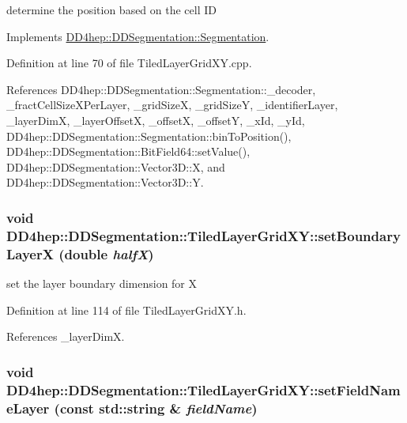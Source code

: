 determine the position based on the cell ID 

Implements \hyperlink{class_d_d4hep_1_1_d_d_segmentation_1_1_segmentation_a594fe6d78667415855858d083b64acad}{DD4hep::DDSegmentation::Segmentation}.

Definition at line 70 of file TiledLayerGridXY.cpp.

References DD4hep::DDSegmentation::Segmentation::\_\-decoder, \_\-fractCellSizeXPerLayer, \_\-gridSizeX, \_\-gridSizeY, \_\-identifierLayer, \_\-layerDimX, \_\-layerOffsetX, \_\-offsetX, \_\-offsetY, \_\-xId, \_\-yId, DD4hep::DDSegmentation::Segmentation::binToPosition(), DD4hep::DDSegmentation::BitField64::setValue(), DD4hep::DDSegmentation::Vector3D::X, and DD4hep::DDSegmentation::Vector3D::Y.\hypertarget{class_d_d4hep_1_1_d_d_segmentation_1_1_tiled_layer_grid_x_y_a713a5e8262e11c1806893ead420f116d}{
\subsubsection[{setBoundaryLayerX}]{\setlength{\rightskip}{0pt plus 5cm}void DD4hep::DDSegmentation::TiledLayerGridXY::setBoundaryLayerX (double {\em halfX})}}
\label{class_d_d4hep_1_1_d_d_segmentation_1_1_tiled_layer_grid_x_y_a713a5e8262e11c1806893ead420f116d}


set the layer boundary dimension for X 

Definition at line 114 of file TiledLayerGridXY.h.

References \_\-layerDimX.\hypertarget{class_d_d4hep_1_1_d_d_segmentation_1_1_tiled_layer_grid_x_y_a2bf0d13d0e1ea42c698c10339e220590}{
\subsubsection[{setFieldNameLayer}]{\setlength{\rightskip}{0pt plus 5cm}void DD4hep::DDSegmentation::TiledLayerGridXY::setFieldNameLayer (const std::string \& {\em fieldName})}}
\label{class_d_d4hep_1_1_d_d_segmentation_1_1_tiled_layer_grid_x_y_a2bf0d13d0e1ea42c698c10339e220590}


